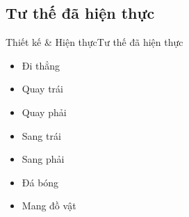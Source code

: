 \documentclass[compress, blue, 13pt,hyperref={pdfpagemode=FullScreen}]{beamer}
\begin{document}
\subsection{Tư thế đã hiện thực}
\begin{frame}{Thiết kế \& Hiện thực}{Tư thế đã hiện thực}
\begin{multicols}{2}
{
\begin{itemize}
\item Đi thẳng
\item Quay trái
\item Quay phải
\item Sang trái
\item Sang phải
\item Đá bóng
\item Mang đồ vật
\end{itemize}
}
\columnbreak


\end{multicols}
\end{frame}
\end{document}
